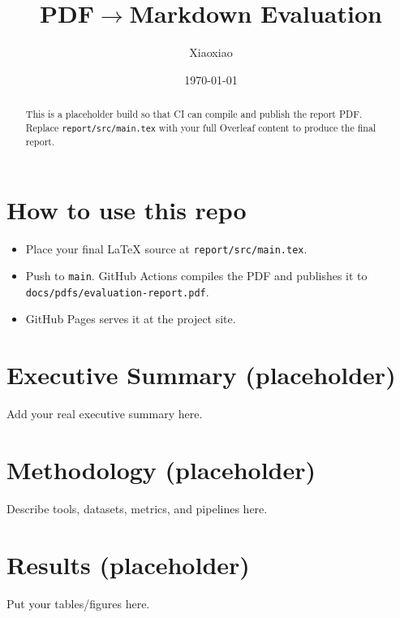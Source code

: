 \documentclass[11pt,a4paper]{article}
\title{PDF\texorpdfstring{$\to$}{->}Markdown Evaluation}
\author{Xiaoxiao}
\date{\today}
\begin{document}
\maketitle

\begin{abstract}
This is a placeholder build so that CI can compile and publish the report PDF.
Replace \texttt{report/src/main.tex} with your full Overleaf content to produce the final report.
\end{abstract}

\section*{How to use this repo}
\begin{itemize}[leftmargin=1.2em]
  \item Place your final \LaTeX{} source at \verb|report/src/main.tex|.
  \item Push to \verb|main|. GitHub Actions compiles the PDF and publishes it to \verb|docs/pdfs/evaluation-report.pdf|.
  \item GitHub Pages serves it at the project site.
\end{itemize}

\section{Executive Summary (placeholder)}
Add your real executive summary here.

\section{Methodology (placeholder)}
Describe tools, datasets, metrics, and pipelines here.

\section{Results (placeholder)}
Put your tables/figures here.
\end{document}
